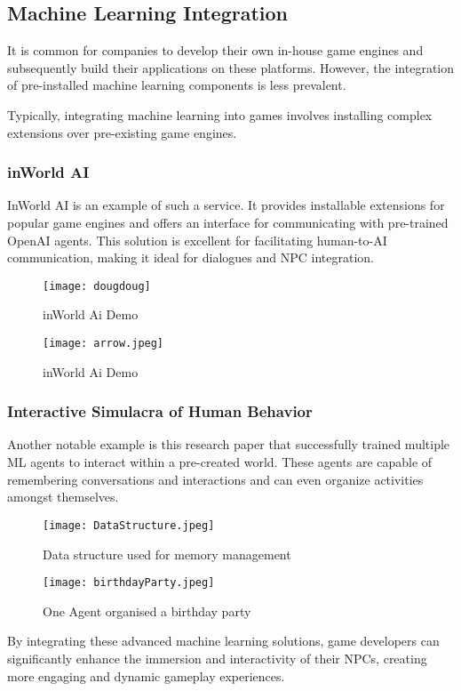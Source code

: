 






\subsection*{Machine Learning Integration}

It is common for companies to develop their own in-house game engines and subsequently build their applications on these platforms. However, the integration of pre-installed machine learning components is less prevalent.

Typically, integrating machine learning into games involves installing complex extensions over pre-existing game engines.

\subsubsection*{inWorld AI}
InWorld AI is an example of such a service. It provides installable extensions for popular game engines and offers an interface for communicating with pre-trained OpenAI agents. This solution is excellent for facilitating human-to-AI communication, making it ideal for dialogues and NPC integration.

\begin{figure}[h]
\centering
\begin{minipage}[t]{0.48\textwidth}
\centering
\texttt{[image: dougdoug]}
\caption{inWorld Ai Demo}
\end{minipage}%
\hfill
\begin{minipage}[t]{0.48\textwidth}
\centering
\texttt{[image: arrow.jpeg]}
\caption{inWorld Ai Demo}
\end{minipage}
\end{figure}

\subsubsection*{Interactive Simulacra of Human Behavior}

Another notable example is this research paper that successfully trained multiple ML agents to interact within a pre-created world. These agents are capable of remembering conversations and interactions and can even organize activities amongst themselves.

\begin{figure}[h]
    \centering
    \begin{minipage}[t]{0.48\textwidth}
        \centering
        \texttt{[image: DataStructure.jpeg]}
        \caption{Data structure used for memory management}
    \end{minipage}%
    \hfill
    \begin{minipage}[t]{0.48\textwidth}
        \centering
        \texttt{[image: birthdayParty.jpeg]}
        \caption{One Agent organised a birthday party}
    \end{minipage}
\end{figure}


By integrating these advanced machine learning solutions, game developers can significantly enhance the immersion and interactivity of their NPCs, creating more engaging and dynamic gameplay experiences.
